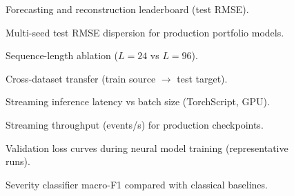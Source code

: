 
\begin{figure}[H]
  \caption{Forecasting and reconstruction leaderboard (test RMSE).}
  \label{fig:neural-forecast-rmse}
\end{figure}

\begin{figure}[H]
  \caption{Multi-seed test RMSE dispersion for production portfolio models.}
  \label{fig:neural-multiseed}
\end{figure}

\begin{figure}[H]
  \caption{Sequence-length ablation ($L=24$ vs $L=96$).}
  \label{fig:seq-ablation}
\end{figure}

\begin{figure}[H]
  \caption{Cross-dataset transfer (train source $\rightarrow$ test target).}
  \label{fig:cross-transfer}
\end{figure}

\begin{figure}[H]
  \caption{Streaming inference latency vs batch size (TorchScript, GPU).}
  \label{fig:streaming-latency}
\end{figure}

\begin{figure}[H]
  \caption{Streaming throughput (events/s) for production checkpoints.}
  \label{fig:streaming-throughput}
\end{figure}

\begin{figure}[H]
  \caption{Validation loss curves during neural model training (representative runs).}
  \label{fig:validation-curves}
\end{figure}

\begin{figure}[H]
  \caption{Severity classifier macro-F1 compared with classical baselines.}
  \label{fig:neural-classification-f1}
\end{figure}
